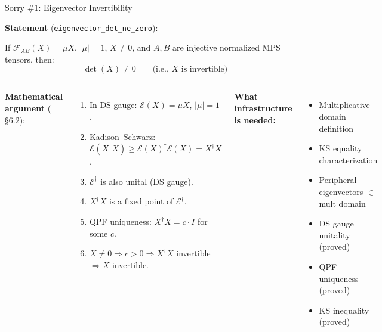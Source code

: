 \documentclass[aspectratio=169,10pt]{beamer}
\begin{document}

\begin{frame}{Sorry \#1: Eigenvector Invertibility}
    \vspace{-0.5em}

    \textbf{\textcolor{softred}{Statement}} (\texttt{eigenvector\_det\_ne\_zero}):

    {\small
    If $\mathcal{F}_{AB}(X) = \mu X$, $|\mu|=1$, $X \neq 0$,
    and $A,B$ are injective normalized MPS tensors, then:
    \[
        \det(X) \neq 0 \qquad\text{(i.e., $X$ is invertible)}
    \]}

    \vspace{0.1em}
    \begin{columns}[T]
        \textbf{Mathematical argument} (\cite{Wolf2012Quantum} \S6.2):
        \begin{enumerate}\itemsep0.1em\small
            \item In DS gauge: $\mathcal{E}(X) = \mu X$, $|\mu|=1$.
            \item Kadison--Schwarz: $\mathcal{E}(X^\dagger X) \geq \mathcal{E}(X)^\dagger \mathcal{E}(X) = X^\dagger X$.
            \item $\mathcal{E}^\dagger$ is also unital (DS gauge).
            \item $X^\dagger X$ is a fixed point of $\mathcal{E}^\dagger$.
            \item QPF uniqueness: $X^\dagger X = c \cdot I$ for some $c$.
            \item $X \neq 0 \Rightarrow c > 0 \Rightarrow X^\dagger X$ invertible $\Rightarrow X$ invertible.
        \end{enumerate}

        \textbf{What infrastructure is needed:}
        \begin{itemize}\itemsep0.1em\small
            \item[\textcolor{amber}{$\circ$}] Multiplicative domain definition
            \item[\textcolor{amber}{$\circ$}] KS equality characterization
            \item[\textcolor{amber}{$\circ$}] Peripheral eigenvectors $\in$ mult domain
            \item[\textcolor{leangreen}{\checkmark}] DS gauge unitality (proved)
            \item[\textcolor{leangreen}{\checkmark}] QPF uniqueness (proved)
            \item[\textcolor{leangreen}{\checkmark}] KS inequality (proved)
        \end{itemize}
    \end{columns}
\end{frame}
\end{document}
